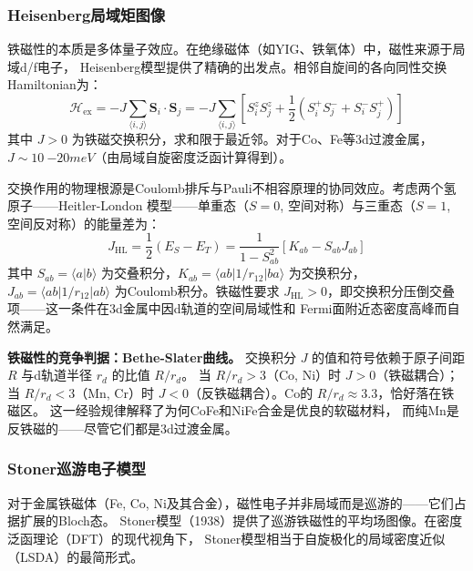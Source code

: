 \documentclass[11pt,a4paper,twoside]{article}
\theoremstyle{definition}
\theoremstyle{plain}
\theoremstyle{remark}
\begin{document}
\subsubsection{Heisenberg局域矩图像}

铁磁性的本质是多体量子效应。在绝缘磁体（如YIG、铁氧体）中，磁性来源于局域d/f电子，
Heisenberg模型提供了精确的出发点。相邻自旋间的各向同性交换Hamiltonian为：
\begin{equation}\label{eq:heisenberg}
  \mathcal{H}_{\text{ex}} = -J \sum_{\langle i,j\rangle} \mathbf{S}_i \cdot \mathbf{S}_j
  = -J \sum_{\langle i,j\rangle} \left[
    S_i^z S_j^z + \frac{1}{2}\left(S_i^+ S_j^- + S_i^- S_j^+\right)
  \right]
\end{equation}
其中 $J > 0$ 为铁磁交换积分，求和限于最近邻。对于Co、Fe等3d过渡金属，
$J \sim \SI{10}{-20}{meV}$（由局域自旋密度泛函计算得到）。

交换作用的物理根源是Coulomb排斥与Pauli不相容原理的协同效应。考虑两个氢原子——Heitler-London
模型——单重态（$S=0$, 空间对称）与三重态（$S=1$, 空间反对称）的能量差为：
\begin{equation}
  J_{\text{HL}} = \frac{1}{2}(E_S - E_T)
  = \frac{1}{1 - S_{ab}^2}\left[ K_{ab} - S_{ab} J_{ab} \right]
\end{equation}
其中 $S_{ab} = \langle a|b \rangle$ 为交叠积分，$K_{ab} = \langle ab|1/r_{12}|ba \rangle$
为交换积分，$J_{ab} = \langle ab|1/r_{12}|ab \rangle$ 为Coulomb积分。铁磁性要求
$J_{\text{HL}} > 0$，即交换积分压倒交叠项——这一条件在3d金属中因d轨道的空间局域性和
Fermi面附近态密度高峰而自然满足。

\begin{physbox}
  \textbf{铁磁性的竞争判据：Bethe-Slater曲线。}
  交换积分 $J$ 的值和符号依赖于原子间距 $R$ 与d轨道半径 $r_d$ 的比值 $R/r_d$。
  当 $R/r_d > 3$（Co, Ni）时 $J > 0$（铁磁耦合）；当 $R/r_d < 3$（Mn, Cr）时
  $J < 0$（反铁磁耦合）。Co的 $R/r_d \approx 3.3$，恰好落在铁磁区。
  这一经验规律解释了为何CoFe和NiFe合金是优良的软磁材料，
  而纯Mn是反铁磁的——尽管它们都是3d过渡金属。
\end{physbox}

\subsubsection{Stoner巡游电子模型}

对于金属铁磁体（Fe, Co, Ni及其合金），磁性电子并非局域而是巡游的——它们占据扩展的Bloch态。
Stoner模型（1938）提供了巡游铁磁性的平均场图像。在密度泛函理论（DFT）的现代视角下，
Stoner模型相当于自旋极化的局域密度近似（LSDA）的最简形式。
\end{document}
